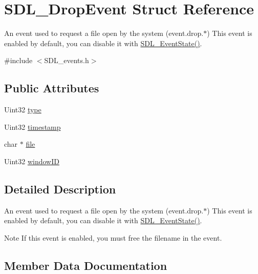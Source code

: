\hypertarget{structSDL__DropEvent}{}\section{S\+D\+L\+\_\+\+Drop\+Event Struct Reference}
\label{structSDL__DropEvent}


An event used to request a file open by the system (event.\+drop.$\ast$) This event is enabled by default, you can disable it with \hyperlink{SDL__events_8h_afb772893e1c46f186fa39a4defe76df3}{S\+D\+L\+\_\+\+Event\+State()}.  




{\ttfamily \#include $<$S\+D\+L\+\_\+events.\+h$>$}

\subsection*{Public Attributes}
\begin{DoxyCompactItemize}
\item 
Uint32 \hyperlink{structSDL__DropEvent_a5ea27cfaa5f8d4940e9a69b68b3cc035}{type}
\item 
Uint32 \hyperlink{structSDL__DropEvent_a02d2c81bb22db632a40cd0021ff751ab}{timestamp}
\item 
char $\ast$ \hyperlink{structSDL__DropEvent_abc41ef4beb62e1d8b56827128b29585f}{file}
\item 
Uint32 \hyperlink{structSDL__DropEvent_a8cecd2178cdc04118bf852e7cf7bf647}{window\+ID}
\end{DoxyCompactItemize}


\subsection{Detailed Description}
An event used to request a file open by the system (event.\+drop.$\ast$) This event is enabled by default, you can disable it with \hyperlink{SDL__events_8h_afb772893e1c46f186fa39a4defe76df3}{S\+D\+L\+\_\+\+Event\+State()}. 

\begin{DoxyNote}{Note}
If this event is enabled, you must free the filename in the event. 
\end{DoxyNote}


\subsection{Member Data Documentation}
\mbox{\label{structSDL__DropEvent_abc41ef4beb62e1d8b56827128b29585f}} 
